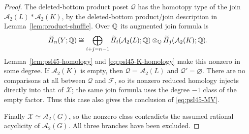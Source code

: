 \begin{proof}
The deleted-bottom product poset $\mathcal Q$ has the homotopy
type of the join
$\mathcal A_2(L)*\mathcal A_2(K)$, by the deleted-bottom product/join
description in Lemma~\ref{lem:product-shuffle}. Over $\mathbb Q$ its augmented join
formula is
\[
 \widetilde H_n(Y;\mathbb Q)\cong
 \bigoplus_{i+j=n-1}
 \widetilde H_i(\mathcal A_2(L);\mathbb Q)\otimes_\mathbb Q
 \widetilde H_j(\mathcal A_2(K);\mathbb Q).
\]
Lemma~\ref{lem:psl45-homology} and
\eqref{eq:psl45-K-homology} make this nonzero in some degree.
If $\mathcal A_2(K)$ is empty, then
$\mathcal Q=\mathcal A_2(L)$ and $\mathcal Q'=\varnothing$.
There are no comparisons at all between $\mathcal Q$ and
$\mathcal F$, so its nonzero reduced homology injects directly
into that of $\mathcal X$; the same join formula uses the
degree $-1$ class of the empty factor. Thus this case also
gives the conclusion of \eqref{eq:psl45-MV}.

Finally $\mathcal X\simeq\mathcal A_2(G)$, so the nonzero
class contradicts the assumed rational acyclicity of
$\mathcal A_2(G)$. All three branches have been excluded.
\end{proof}
